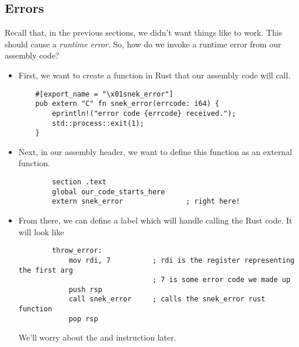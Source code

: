 \documentclass[letterpaper]{article}
\begin{document}
\subsection{Errors}
Recall that, in the previous sections, we didn't want things like  to work. This should cause a \emph{runtime error}. So, how do we invoke a runtime error from our assembly code? 
\begin{itemize}
    \item First, we want to create a function in Rust that our assembly code will call. 
    \begin{verbatim}
    #[export_name = "\x01snek_error"]
    pub extern "C" fn snek_error(errcode: i64) {
        eprintln!("error code {errcode} received.");
        std::process::exit(1);
    }\end{verbatim}
    
    \item Next, in our assembly header, we want to define this function as an external function. 
    \begin{verbatim}
        section .text 
        global our_code_starts_here 
        extern snek_error               ; right here!\end{verbatim}

    \item From there, we can define a  label which will handle calling the Rust code. It will look like 
    \begin{verbatim}
        throw_error: 
            mov rdi, 7          ; rdi is the register representing the first arg 
                                ; 7 is some error code we made up 
            push rsp    
            call snek_error     ; calls the snek_error rust function 
            pop rsp \end{verbatim}
    We'll worry about the  and  instruction later. 
\end{itemize}
\end{document}

